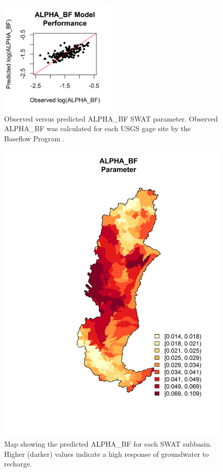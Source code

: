 \begin{figure}
	\centering
	\includegraphics[width=0.5\textwidth]{./img/alpha_bf_scatterplot.png}
	\caption{Observed versus predicted ALPHA\_BF SWAT parameter. Observed ALPHA\_BF was calculated for each USGS gage site  by the Baseflow Program \citep{arnold_automated_1995}.}
	\label{fig:alpha_bf_scatterplot}
\end{figure}

\begin{figure}[h!]
	\centering
	\includegraphics[width=\textwidth]{./img/alpha_bf.png}
	\caption{Map showing the predicted ALPHA\_BF for each SWAT subbasin. Higher (darker) values indicate a high response of groundwater to recharge.}
	\label{fig:alpha_bf}
\end{figure}

